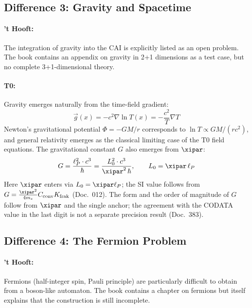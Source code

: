 \subsection{Difference 3: Gravity and Spacetime}

\paragraph{'t Hooft:} The integration of gravity into the CAI is explicitly listed
as an open problem. The book contains an appendix on gravity in 2+1 dimensions
as a test case, but no complete 3+1-dimensional theory.

\paragraph{T0:} Gravity emerges naturally from the time-field gradient:
\begin{equation}
    \vec{g}(x) = -c^2 \nabla \ln T(x) = -\frac{c^2}{T} \nabla T
    \label{eq:t0_gravity}
\end{equation}
Newton's gravitational potential $\Phi = -GM/r$ corresponds to
$\ln T \propto GM/(rc^2)$, and general relativity emerges as the classical
limiting case of the T0 field equations. The gravitational constant $G$ also
emerges from $\xipar$:
\begin{equation}
    G = \frac{\ell_P^2 \cdot c^3}{\hbar} = \frac{L_0^2 \cdot c^3}{\xipar^2\,\hbar}, \qquad L_0 = \xipar\,\ell_P
    \label{eq:G_from_xi}
\end{equation}
Here $\xipar$ enters via $L_0 = \xipar\ell_P$; the SI value follows from
$G = \frac{\xipar^2}{4m_e}C_{\text{conv}}K_{\text{frak}}$ (Doc.~012). The form and the
order of magnitude of $G$ follow from $\xipar$ and the single anchor; the agreement
with the CODATA value in the last digit is not a separate precision result (Doc.~383).

\subsection{Difference 4: The Fermion Problem}

\paragraph{'t Hooft:} Fermions (half-integer spin, Pauli principle) are
particularly difficult to obtain from a boson-like automaton. The book contains
a chapter on fermions but itself explains that the construction is still incomplete.

